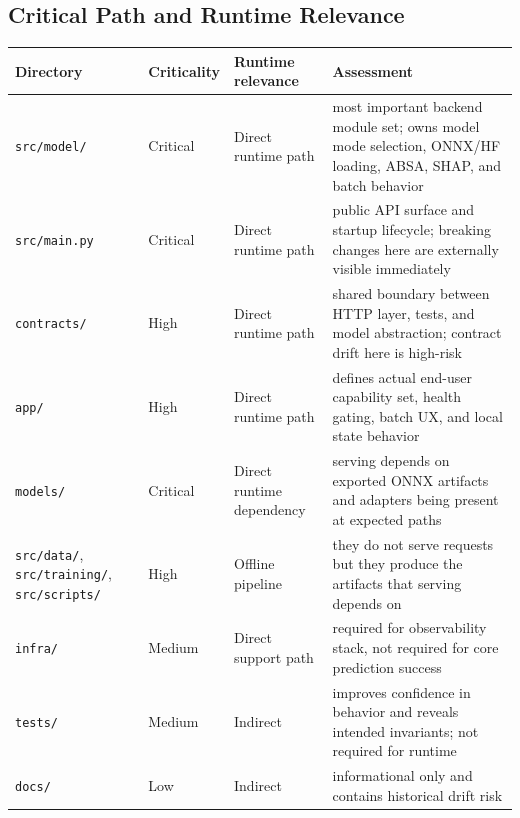 \subsection{Critical Path and Runtime Relevance}
\begin{table}[H]
\centering
\begin{tabularx}{\textwidth}{@{}l l l X@{}}
\toprule
\textbf{Directory} & \textbf{Criticality} & \textbf{Runtime relevance} & \textbf{Assessment} \\
\midrule
\texttt{src/model/} & Critical & Direct runtime path & most important backend module set; owns model mode selection, ONNX/HF loading, ABSA, SHAP, and batch behavior \\
\texttt{src/main.py} & Critical & Direct runtime path & public API surface and startup lifecycle; breaking changes here are externally visible immediately \\
\texttt{contracts/} & High & Direct runtime path & shared boundary between HTTP layer, tests, and model abstraction; contract drift here is high-risk \\
\texttt{app/} & High & Direct runtime path & defines actual end-user capability set, health gating, batch UX, and local state behavior \\
\texttt{models/} & Critical & Direct runtime dependency & serving depends on exported ONNX artifacts and adapters being present at expected paths \\
\texttt{src/data/}, \texttt{src/training/}, \texttt{src/scripts/} & High & Offline pipeline & they do not serve requests but they produce the artifacts that serving depends on \\
\texttt{infra/} & Medium & Direct support path & required for observability stack, not required for core prediction success \\
\texttt{tests/} & Medium & Indirect & improves confidence in behavior and reveals intended invariants; not required for runtime \\
\texttt{docs/} & Low & Indirect & informational only and contains historical drift risk \\
\bottomrule
\end{tabularx}
\end{table}

